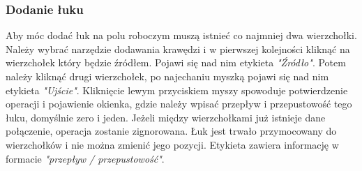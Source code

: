 \subsubsection{Dodanie łuku}
Aby móc dodać łuk na polu roboczym muszą istnieć co najmniej dwa wierzchołki. Należy wybrać narzędzie dodawania krawędzi i w pierwszej kolejności kliknąć na wierzchołek który będzie źródłem. Pojawi się nad nim etykieta \textit{"Źródło"}. Potem należy kliknąć drugi wierzchołek, po najechaniu myszką pojawi się nad nim etykieta \textit{"Ujście"}. Kliknięcie lewym przyciskiem myszy spowoduje potwierdzenie operacji i pojawienie okienka, gdzie należy wpisać przepływ i przepustowość tego łuku, domyślnie zero i jeden. Jeżeli między wierzchołkami już istnieje dane połączenie, operacja zostanie zignorowana. Łuk jest trwało przymocowany do wierzchołków i nie można zmienić jego pozycji. Etykieta zawiera informację w formacie \emph{"przepływ / przepustowość"}.
